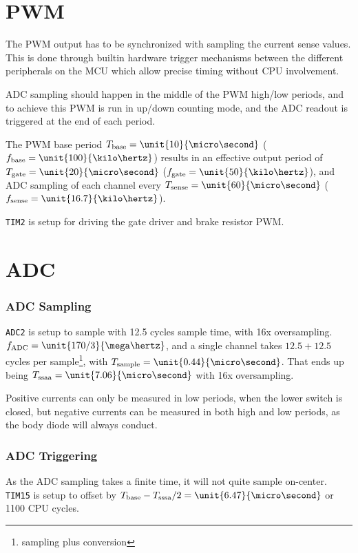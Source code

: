 \documentclass[12pt,a4paper,oneside,openany]{article}
\begin{document}
\section{PWM}

The PWM output has to be synchronized with sampling the current sense values. This is done through builtin hardware trigger mechanisms between the different peripherals on the MCU which allow precise timing without CPU involvement.

ADC sampling should happen in the middle of the PWM high/low periods, and to achieve this PWM is run in up/down counting mode, and the ADC readout is triggered at the end of each period.

The PWM base period $T_{\textrm{base}} = \unit{10}{\micro\second}$ ($f_{\textrm{base}} = \unit{100}{\kilo\hertz}$) results in an effective output period of $T_{\textrm{gate}} = \unit{20}{\micro\second}$ ($f_{\textrm{gate}} = \unit{50}{\kilo\hertz}$), and ADC sampling of each channel every $T_{\textrm{sense}} = \unit{60}{\micro\second}$ ($f_{\textrm{sense}} = \unit{16.7}{\kilo\hertz}$).

\texttt{TIM2} is setup for driving the gate driver and brake resistor PWM.

\section {ADC}

\subsubsection{ADC Sampling}

\texttt{ADC2} is setup to sample with 12.5 cycles sample time, with 16x oversampling. $f_{\textrm{ADC}} = \unit{170/3}{\mega\hertz}$, and a single channel takes $12.5+12.5$ cycles per sample\footnote{sampling plus conversion}, with $T_{\textrm{sample}} = \unit{0.44}{\micro\second}$. That ends up being $T_{\textrm{ssaa}} = \unit{7.06}{\micro\second}$ with 16x oversampling.

Positive currents can only be measured in low periods, when the lower switch is closed, but negative currents can be measured in both high and low periods, as the body diode will always conduct.

\subsubsection{ADC Triggering}

As the ADC sampling takes a finite time, it will not quite sample on-center. \texttt{TIM15} is setup to offset by $T_{\textrm{base}} - T_{\textrm{sssa}}/2 = \unit{6.47}{\micro\second}$ or 1100 CPU cycles.
\end{document}
